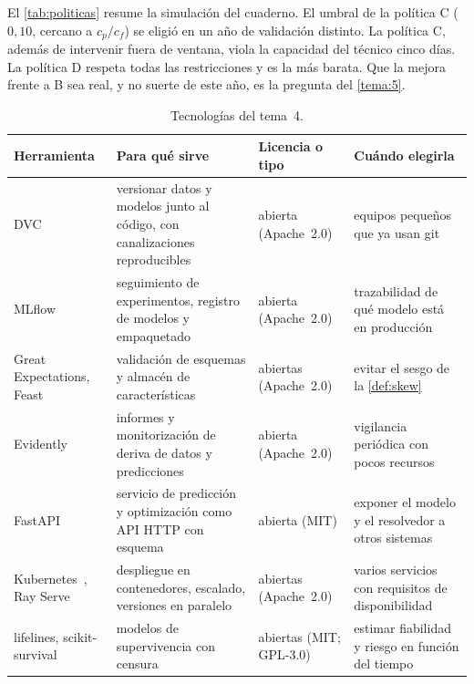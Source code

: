 El \cref{tab:politicas} resume la simulación del cuaderno. El umbral de la política C ($0{,}10$, cercano a $c_p/c_f$) se eligió en un año de validación distinto. La política C, además de intervenir fuera de ventana, viola la capacidad del técnico cinco días. La política D respeta todas las restricciones y es la más barata. Que la mejora frente a B sea real, y no suerte de este año, es la pregunta del \cref{tema:5}.

\begin{table}[h]
\centering\small
\caption{Tecnologías del tema~4.}\label{tab:tec4}
\begin{tabularx}{\textwidth}{@{}>{\raggedright\arraybackslash}p{2.5cm}>{\raggedright\arraybackslash}X>{\raggedright\arraybackslash}p{2.1cm}>{\raggedright\arraybackslash}X@{}}
\toprule
Herramienta & Para qué sirve & Licencia o tipo & Cuándo elegirla \\
\midrule
DVC~\cite{dvc} & versionar datos y modelos junto al código, con canalizaciones reproducibles & abierta (Apache~2.0) & equipos pequeños que ya usan git \\
MLflow~\cite{mlflow} & seguimiento de experimentos, registro de modelos y empaquetado & abierta (Apache~2.0) & trazabilidad de qué modelo está en producción \\
Great Expectations, Feast & validación de esquemas y almacén de características & abiertas (Apache~2.0) & evitar el sesgo de la \cref{def:skew} \\
Evidently~\cite{evidently} & informes y monitorización de deriva de datos y predicciones & abierta (Apache~2.0) & vigilancia periódica con pocos recursos \\
FastAPI~\cite{fastapi} & servicio de predicción y optimización como API HTTP con esquema & abierta (MIT) & exponer el modelo y el resolvedor a otros sistemas \\
Kubernetes~\cite{k8s}, Ray Serve~\cite{ray} & despliegue en contenedores, escalado, versiones en paralelo & abiertas (Apache~2.0) & varios servicios con requisitos de disponibilidad \\
lifelines, scikit-survival & modelos de supervivencia con censura & abiertas (MIT; GPL-3.0) & estimar fiabilidad y riesgo en función del tiempo \\
\bottomrule
\end{tabularx}
\end{table}

\addtocounter{definicion}{1}%

